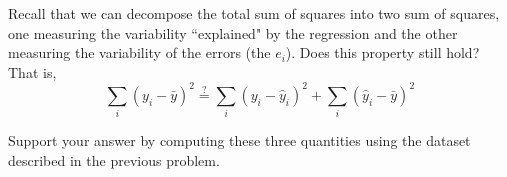 \documentclass[addpoints, 12pt]{exam}
\begin{document}
\begin{questions}
\question Recall that we can decompose the total sum of squares into two sum of squares, one measuring the variability ``explained" by the regression and the other
measuring the variability of the errors (the $e_i$).
Does this property still hold? That is, 
$$
\sum_i (y_i - \bar{y})^2  \stackrel{?}{=}
\sum_i (y_i - \hat{y}_i)^2 + 
\sum_i (\hat{y}_i - \bar{y})^2 
$$


Support your answer by computing these three quantities using the dataset described in the previous problem.



\end{questions}
\end{document}
